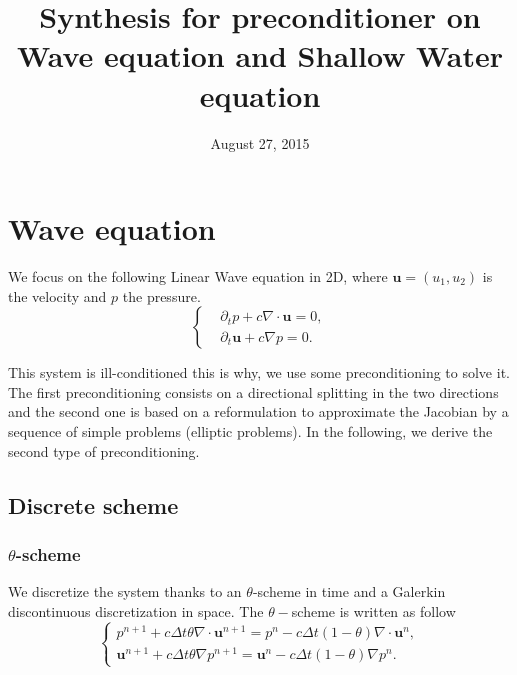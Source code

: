 \documentclass[a4paper, 11pt]{report}
\begin{document}
\title{Synthesis for preconditioner on Wave equation and Shallow Water equation}
\date{August 27, 2015}
\author{}
\maketitle

\chapter{Wave equation}

We focus on the following Linear Wave equation in 2D, where $\boldsymbol{u}=(u_1,u_2)$ is the velocity and $p$ the pressure.
\begin{equation*}
\left\{\begin{split}
&\partial_t p+c \nabla \cdot \boldsymbol{u}=0,\\
&\partial_t \boldsymbol{u} +c\nabla p=0.
\end{split}
\right.
\end{equation*}

This system is ill-conditioned this is why, we use some preconditioning to solve it.\\
The first preconditioning consists on a directional splitting in the two directions and the second one is based on a reformulation to approximate the Jacobian by a sequence of simple problems (elliptic problems). In the following, we derive the second type of preconditioning.

\section{Discrete scheme}


\subsection{$\theta$-scheme}
We discretize the system thanks to an $\theta$-scheme in time and a Galerkin discontinuous discretization in space.
The $\theta-$scheme is written as follow
\begin{equation*}
\left\{
\begin{split}
p^{n+1}+c\Delta t\theta\nabla\cdot \boldsymbol{u}^{n+1}=p^n-c\Delta t(1-\theta)\nabla \cdot \boldsymbol{u}^n,\\
\boldsymbol{u}^{n+1}+c\Delta t\theta\nabla p^{n+1}=\boldsymbol{u}^n-c\Delta t(1-\theta)\nabla p^n.
\end{split}
\right.
\end{equation*}
\end{document}
